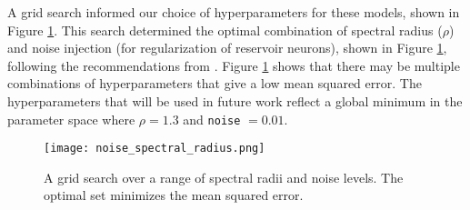 A grid search informed our choice of hyperparameters for these models, shown in
Figure \ref{fig:gridsearch}. This search determined the optimal combination of
spectral radius ($\rho$) and noise injection (for regularization of reservoir
neurons), shown in Figure \ref{fig:gridsearch}, following the recommendations
from \cite{lukosevicius_practical_2012}. Figure
\ref{fig:gridsearch} shows that there may be multiple combinations of
hyperparameters that give a low mean squared error. The hyperparameters that
will be used in future work reflect a global minimum in the parameter space
where $\rho = 1.3$ and \texttt{noise} $= 0.01$. 

\begin{figure}[h]
  \centering
  \texttt{[image: noise\_spectral\_radius.png]}
  \caption{A grid search over a range of spectral radii and noise levels. The
  optimal set minimizes the mean squared error.}
  \label{fig:gridsearch}
\end{figure}
